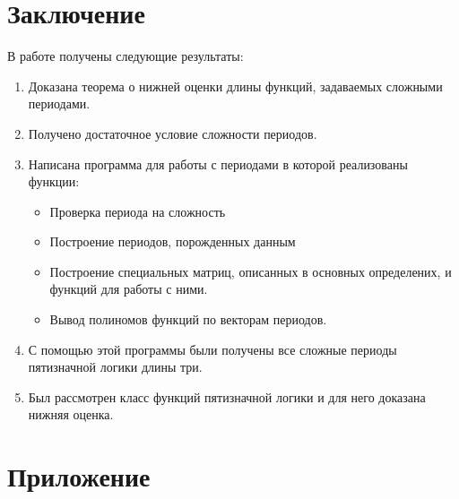 \documentclass[bibliography=totoc, a4paper, 14pt]{extarticle}
\let\stdsection\section
\renewcommand\section{\newpage\stdsection}
\begin{document}
\section{Заключение}
В работе получены следующие результаты:
\begin{enumerate}
\item Доказана теорема о нижней оценки длины функций, задаваемых сложными периодами.

\item Получено достаточное условие сложности периодов.

\item Написана программа для работы с периодами в которой реализованы функции:
\begin{itemize}
\item Проверка периода на сложность
\item Построение периодов, порожденных данным
\item Построение специальных матриц, описанных в основных определених,
и функций для работы с ними.
\item Вывод полиномов функций по векторам периодов.
\end{itemize}

\item С помощью этой программы были получены все сложные периоды пятизначной логики
длины три.

\item Был рассмотрен класс функций пятизначной логики и для него доказана нижняя оценка.
\end{enumerate}


\section{Приложение}

%
\end{document}
